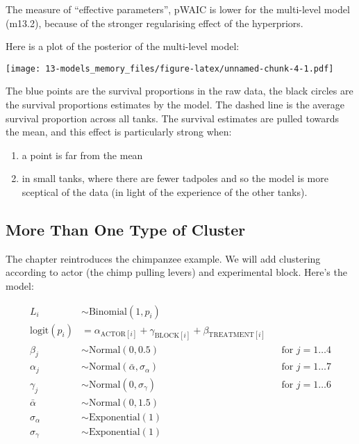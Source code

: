 \documentclass[
]{book}
\providecommand{\tightlist}{%
  \setlength{\itemsep}{0pt}\setlength{\parskip}{0pt}}
\begin{document}
The measure of ``effective parameters'', pWAIC is lower for the multi-level model (m13.2), because of the stronger regularising effect of the hyperpriors.

Here is a plot of the posterior of the multi-level model:

\texttt{[image: 13-models\_memory\_files/figure-latex/unnamed-chunk-4-1.pdf]}

The blue points are the survival proportions in the raw data, the black circles are the survival proportions estimates by the model. The dashed line is the average survival proportion across all tanks. The survival estimates are pulled towards the mean, and this effect is particularly strong when:

\begin{enumerate}
\def\labelenumi{\arabic{enumi}.}
\tightlist
\item
  a point is far from the mean
\item
  in small tanks, where there are fewer tadpoles and so the model is more sceptical of the data (in light of the experience of the other tanks).
\end{enumerate}

\hypertarget{more-than-one-type-of-cluster}{%
\subsection*{More Than One Type of Cluster}\label{more-than-one-type-of-cluster}}

The chapter reintroduces the chimpanzee example. We will add clustering according to actor (the chimp pulling levers) and experimental block. Here's the model:

\[
\begin{aligned}
L_i &\sim \text{Binomial}(1,p_i) \\
\text{logit}(p_i) &= \alpha_{\text{ACTOR}[i]} + \gamma_{\text{BLOCK}[i]} + \beta_{\text{TREATMENT}[i]} \\
\beta_j &\sim \text{Normal}(0,0.5) && \text{for } j = 1 \dots 4 \\
\alpha_j &\sim \text{Normal}(\bar{\alpha},\sigma_\alpha) && \text{for } j = 1 \dots 7\\
\gamma_j &\sim \text{Normal}(0,\sigma_\gamma) && \text{for } j = 1 \dots 6\\
\bar{\alpha} & \sim \text{Normal}(0,1.5) \\
\sigma_\alpha &\sim \text{Exponential}(1) \\
\sigma_\gamma &\sim \text{Exponential}(1)
\end{aligned}
\]
\end{document}
